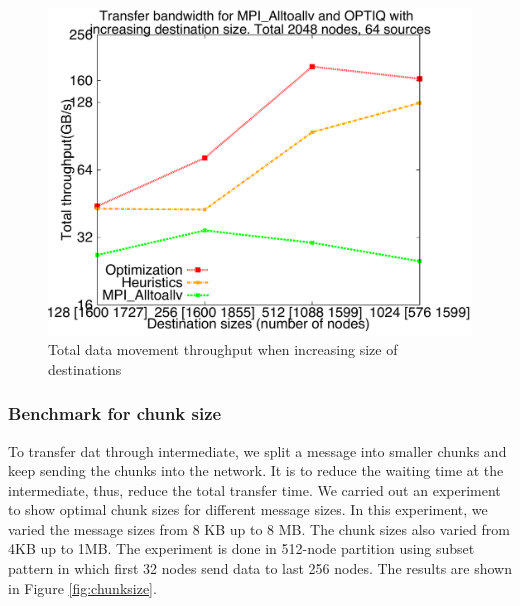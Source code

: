\begin{figure}[!htb]
\vspace{-0.1in}
\centering
\includegraphics[scale=0.30]{figures/incrsize.pdf}
\vspace{-0.1in}
\caption{Total data movement throughput when increasing size of destinations}
\vspace{-0.1in}
\label{fig:incrsize}
\end{figure}

\subsubsection{Benchmark for chunk size}

To transfer dat through intermediate, we split a message into smaller chunks and keep sending the chunks into the network. It is to reduce the waiting time at the intermediate, thus, reduce the total transfer time. We carried out an experiment to show optimal chunk sizes for different message sizes. In this experiment, we varied the message sizes from 8 KB up to 8 MB. The chunk sizes also varied from 4KB up to 1MB. The experiment is done in 512-node partition using subset pattern in which first 32 nodes send data to last 256 nodes. The results are shown in Figure \ref{fig:chunksize}.

